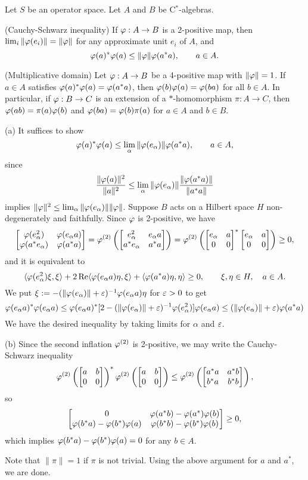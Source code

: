 \documentclass{../../large}
\begin{document}
\begin{prb}
Let $S$ be an operator space.
Let $A$ and $B$ be C$^*$-algebras.
\begin{parts}
\item (Cauchy-Schwarz inequality)
If $\f:A\to B$ is a 2-positive map, then $\lim_i\|\f(e_i)\|=\|\f\|$ for any approximate unit $e_i$ of $A$, and
\[\f(a)^*\f(a)\le\|\f\|\f(a^*a),\qquad a\in A.\]
\item (Multiplicative domain)
Let $\f:A\to B$ be a 4-positive map with $\|\f\|=1$.
If $a\in A$ satisfies $\f(a)^*\f(a)=\f(a^*a)$, then $\f(b)\f(a)=\f(ba)$ for all $b\in A$.
In particular, if $\f:B\to C$ is an extension of a $*$-homomorphism $\pi:A\to C$, then $\f(ab)=\pi(a)\f(b)$ and $\f(ba)=\f(b)\pi(a)$ for $a\in A$ and $b\in B$.
\end{parts}
\end{prb}
\begin{pf}
(a)
It suffices to show
\[\f(a)^*\f(a)\le\lim_\alpha\|\f(e_\alpha)\|\f(a^*a),\qquad a\in A,\]
since
\[\frac{\|\f(a)\|^2}{\|a\|^2}\le\lim_\alpha\|\f(e_\alpha)\|\frac{\|\f(a^*a)\|}{\|a^*a\|}\]
implies $\|\f\|^2\le\lim_\alpha\|\f(e_\alpha)\|\|\f\|$.
Suppose $B$ acts on a Hilbert space $H$ non-degenerately and faithfully.
Since $\f$ is 2-positive, we have
\[\mat[b]{\f(e_\alpha^2)&\f(e_\alpha a)\\\f(a^*e_\alpha)&\f(a^*a)}=\f^{(2)}\left(\mat[b]{e_\alpha^2&e_\alpha a\\a^*e_\alpha&a^*a}\right)=\f^{(2)}\left(\mat[b]{e_\alpha&a\\0&0}^*\mat[b]{e_\alpha&a\\0&0}\right)\ge0,\]
and it is equivalent to
\[\<\f(e_\alpha^2)\xi,\xi\>+2\Re\<\f(e_\alpha a)\eta,\xi\>+\<\f(a^*a)\eta,\eta\>\ge0,\qquad\xi,\eta\in H,\quad a\in A.\]
We put $\xi:=-(\|\f(e_\alpha)\|+\e)^{-1}\f(e_\alpha a)\eta$ for $\e>0$ to get
\[\f(e_\alpha a)^*\f(e_\alpha a)
\le\f(e_\alpha a)^*[2-(\|\f(e_\alpha)\|+\e)^{-1}\f(e_\alpha^2)]\f(e_\alpha a)
\le(\|\f(e_\alpha)\|+\e)\f(a^*a)\]
We have the desired inequality by taking limits for $\alpha$ and $\e$.

(b)
Since the second inflation $\f^{(2)}$ is 2-positive, we may write the Cauchy-Schwarz inequality
\[\f^{(2)}\left(\mat[b]{a&b\\0&0}\right)^*\f^{(2)}\left(\mat[b]{a&b\\0&0}\right)\le\f^{(2)}\left(\mat[b]{a^*a&a^*b\\b^*a&b^*b}\right),\]
so
\[\mat[b]{0&\f(a^*b)-\f(a^*)\f(b)\\\f(b^*a)-\f(b^*)\f(a)&\f(b^*b)-\f(b^*)\f(b)}\ge0,\]
which implies $\f(b^*a)-\f(b^*)\f(a)=0$ for any $b\in A$.

Note that $\|\pi\|=1$ if $\pi$ is not trivial.
Using the above argument for $a$ and $a^*$, we are done.
\end{pf}
\end{document}
